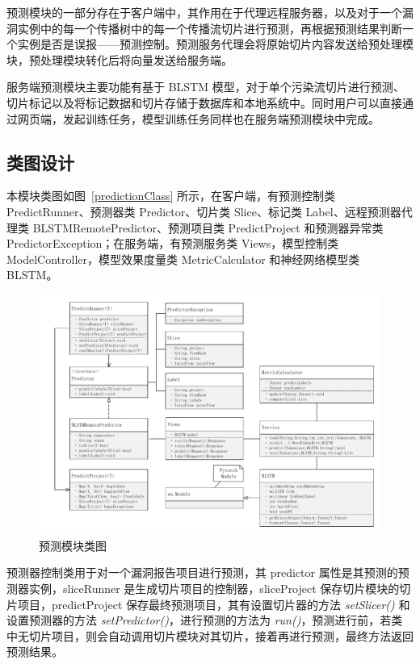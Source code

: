 预测模块的一部分存在于客户端中，其作用在于代理远程服务器，以及对于一个漏洞实例中的每一个传播树中的每一个传播流切片进行预测，再根据预测结果判断一个实例是否是误报——预测控制。预测服务代理会将原始切片内容发送给预处理模块，预处理模块转化后将向量发送给服务端。

服务端预测模块主要功能有基于 BLSTM 模型，对于单个污染流切片进行预测、切片标记以及将标记数据和切片存储于数据库和本地系统中。同时用户可以直接通过网页端，发起训练任务，模型训练任务同样也在服务端预测模块中完成。\\

\subsection{类图设计}

本模块类图如图~\ref{predictionClass} 所示，在客户端，有预测控制类 PredictRunner、预测器类 Predictor、切片类 Slice、标记类 Label、远程预测器代理类 BLSTMRemotePredictor、预测项目类 PredictProject 和预测器异常类 PredictorException；在服务端，有预测服务类 Views，模型控制类 ModelController，模型效果度量类 MetricCalculator 和神经网络模型类 BLSTM。

\begin{figure}[!htbp]
    \centering
    \includegraphics[width=0.9\linewidth]{FIGs/chapter3/predictClass.pdf}
    \caption{预测模块类图}\label{predictClass}
\end{figure}

预测器控制类用于对一个漏洞报告项目进行预测，其 predictor 属性是其预测的预测器实例，sliceRunner 是生成切片项目的控制器，sliceProject 保存切片模块的切片项目，predictProject 保存最终预测项目，其有设置切片器的方法 \textit{setSlicer()} 和设置预测器的方法 \textit{setPredictor()}，进行预测的方法为 \textit{run()}，预测进行前，若类中无切片项目，则会自动调用切片模块对其切片，接着再进行预测，最终方法返回预测结果。

